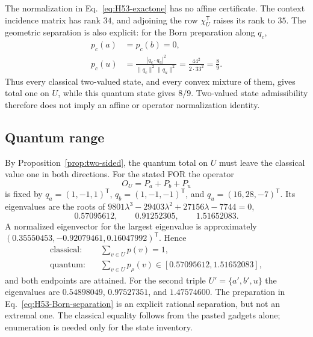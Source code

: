 \documentclass[aps,pra,reprint,superscriptaddress,longbibliography,nofootinbib,floatfix,10pt]{revtex4-2}
\theoremstyle{definition}\newtheorem{definition}[theorem]{Definition}
\theoremstyle{remark}\newtheorem{remark}[theorem]{Remark}
\begin{document}
The normalization in Eq.~\eqref{eq:H53-exactone} has no affine certificate. The context incidence matrix has rank $34$, and adjoining the row $\chi_U^{\mathsf T}$ raises its rank to $35$. The geometric separation is also explicit: for the Born preparation along $q_c$,
\begin{equation}\label{eq:H53-Born-separation}
\begin{aligned}
p_c(a)&=p_c(b)=0,\\
p_c(u)&=\frac{|q_c\cdot q_u|^2}{\|q_c\|^2\|q_u\|^2}
=\frac{44^2}{2\cdot33^2}=\frac89.
\end{aligned}
\end{equation}
Thus every classical two-valued state, and every convex mixture of them, gives total one on $U$, while this quantum state gives $8/9$. Two-valued state admissibility therefore does not imply an affine or operator normalization identity.

\subsection{Quantum range}\label{sec:weighted-H53}
By Proposition~\ref{prop:two-sided}, the quantum total on $U$ must leave the classical value one in both directions. For the stated FOR the operator
\begin{equation}\label{eq:H53-operator}
O_U=P_a+P_b+P_u
\end{equation}
is fixed by $q_a=(1,-1,1)^{\mathsf T}$, $q_b=(1,-1,-1)^{\mathsf T}$, and $q_u=(16,28,-7)^{\mathsf T}$. Its eigenvalues are the roots of $9801\lambda^3-29403\lambda^2+27156\lambda-7744=0$,
\begin{equation}\label{eq:H53-spectrum}
0.57095612,\qquad0.91252305,\qquad1.51652083.
\end{equation}
A normalized eigenvector for the largest eigenvalue is approximately $(0.35550453,-0.92079461,0.16047992)^{\mathsf T}$. Hence
\begin{equation}\label{eq:H53-classical-quantum-interval}
\begin{aligned}
\text{classical:}\quad&\sum_{v\in U}p(v)=1,\\
\text{quantum:}\quad&\sum_{v\in U}p_\rho(v)\in[0.57095612,1.51652083],
\end{aligned}
\end{equation}
and both endpoints are attained. For the second triple $U'=\{a',b',u\}$ the eigenvalues are $0.54898049$, $0.97527351$, and $1.47574600$. The preparation in Eq.~\eqref{eq:H53-Born-separation} is an explicit rational separation, but not an extremal one. The classical equality follows from the pasted gadgets alone; enumeration is needed only for the state inventory.
\end{document}
